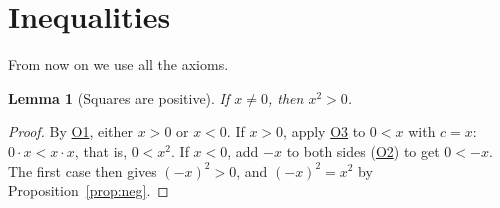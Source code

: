 \documentclass[11pt]{article}
\newcommand{\axO}[1]{\hyperref[ax:O#1]{O#1}}
\theoremstyle{plain}
\newtheorem{lemma}[theorem]{Lemma}
\theoremstyle{definition}
\theoremstyle{remark}
\begin{document}
\section{Inequalities}

From now on we use all the axioms.

\begin{lemma}[Squares are positive]\label{lem:keystone}
If $x \neq 0$, then $x^2 > 0$.
\end{lemma}
\begin{proof}
By \axO{1}, either $x > 0$ or $x < 0$. If $x > 0$, apply \axO{3} to $0 < x$ with $c = x$: $0 \cdot x < x \cdot x$, that is, $0 < x^2$. If $x < 0$, add $-x$ to both sides (\axO{2}) to get $0 < -x$. The first case then gives $(-x)^2 > 0$, and $(-x)^2 = x^2$ by Proposition~\ref{prop:neg}.
\end{proof}
\end{document}

